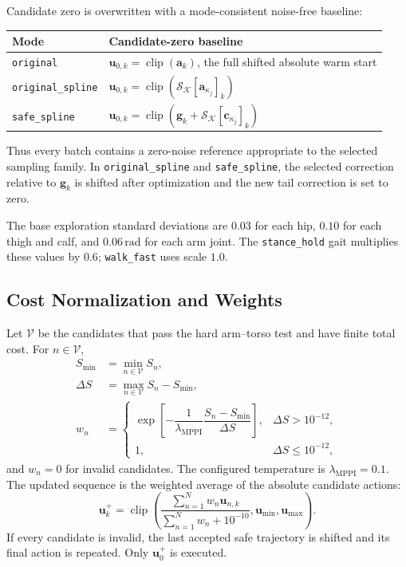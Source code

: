 \documentclass[11pt,a4paper]{article}
\newcommand{\clip}{\operatorname{clip}}
\newcommand{\code}[1]{\texttt{#1}}
\begin{document}
Candidate zero is overwritten with a mode-consistent noise-free baseline:
\begin{center}
\begin{tabular}{p{}p{}}
\toprule
Mode & Candidate-zero baseline\\
\midrule
\code{original}
& $\bm{u}_{0,k}=\clip(\bm{a}_k)$, the full shifted absolute warm start\\
\code{original\_spline}
& $\bm{u}_{0,k}=\clip(
   \mathcal{S}_{\mathcal{K}}[\bm{a}_{\kappa_j}]_k)$\\
\code{safe\_spline}
& $\bm{u}_{0,k}=\clip(
   \bm{g}_k+\mathcal{S}_{\mathcal{K}}[\bm{c}_{\kappa_j}]_k)$\\
\bottomrule
\end{tabular}
\end{center}
Thus every batch contains a zero-noise reference appropriate to the selected
sampling family. In \code{original\_spline} and \code{safe\_spline}, the
selected correction relative to $\bm{g}_k$ is shifted after optimization and
the new tail correction is set to zero.

The base exploration standard deviations are $0.03$ for each hip, $0.10$ for
each thigh and calf, and $0.06\,\mathrm{rad}$ for each arm joint. The
\code{stance\_hold} gait multiplies these values by $0.6$;
\code{walk\_fast} uses scale $1.0$.

\subsection{Cost Normalization and Weights}

Let $\mathcal{V}$ be the candidates that pass the hard arm--torso test and
have finite total cost. For $n\in\mathcal{V}$,
\begin{align}
  S_{\min}&=\min_{n\in\mathcal{V}}S_n,\\
  \Delta S&=\max_{n\in\mathcal{V}}S_n-S_{\min},\\
  w_n&=
  \begin{cases}
    \exp\!\left[
      -\dfrac{1}{\lambda_{\mathrm{MPPI}}}
       \dfrac{S_n-S_{\min}}{\Delta S}
    \right],
    &\Delta S>10^{-12},\\
    1,&\Delta S\leq10^{-12},
  \end{cases}
\end{align}
and $w_n=0$ for invalid candidates. The configured temperature is
$\lambda_{\mathrm{MPPI}}=0.1$. The updated sequence is the weighted average
of the absolute candidate actions:
\begin{equation}
  \boxed{
  \bm{u}^{+}_k=
  \clip\left(
    \frac{\sum_{n=1}^{N}w_n\bm{u}_{n,k}}
         {\sum_{n=1}^{N}w_n+10^{-10}},
    \bm{u}_{\min},\bm{u}_{\max}
  \right).
  }
\end{equation}
If every candidate is invalid, the last accepted safe trajectory is shifted
and its final action is repeated. Only $\bm{u}^{+}_0$ is executed.
\end{document}
